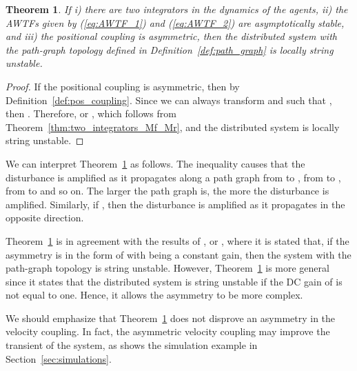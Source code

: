 \documentclass[10pt,twocolumn,twoside]{IEEEtran}
\newtheorem{theorem}{Theorem}
\theoremstyle{definition}
\newcommand{\revA}{Black}
\begin{document}
\begin{theorem}\label{thm:sym_coupl}
If i) there are two integrators in the dynamics of the agents, ii) the AWTFs given by (\ref{eq:AWTF_1}) and (\ref{eq:AWTF_2}) are asymptotically stable, and iii) the positional coupling is asymmetric, then the distributed system {\color{\revA}with the path-graph topology defined in Definition~\ref{def:path_graph}} is locally string unstable.
\end{theorem}
\begin{proof}
If the positional coupling is asymmetric, then  by Definition~\ref{def:pos_coupling}. Since we can always transform  and  such that , then . Therefore,  or , which follows from Theorem~\ref{thm:two_integrators_Mf_Mr}, and the distributed system is locally string unstable.

\end{proof}

We can interpret Theorem~\ref{thm:sym_coupl} as follows. The inequality  causes that the disturbance is amplified as it propagates {\color{\revA}along a path graph} from  to , from  to , from  to  and so on. The larger the path graph is, the more the disturbance is amplified. Similarly, if , then the disturbance is amplified as it propagates in the opposite direction.





Theorem~\ref{thm:sym_coupl} is in agreement with the results of \cite{Barooah2009}, \cite{Tangerman2012} or \cite{Herman2014c}, where it is stated that, if the asymmetry is in the form of  with  being a constant gain, then the system with the path-graph topology is string unstable. However, Theorem~\ref{thm:sym_coupl} is more general since it states that the distributed system is string unstable if the DC gain of  is not equal to one. Hence, it allows the asymmetry to be more complex.

We should emphasize that Theorem~\ref{thm:sym_coupl} does not disprove an asymmetry in the velocity coupling. In fact, the asymmetric velocity coupling may improve the transient of the system, as shows the simulation example in Section~\ref{sec:simulations}.
\end{document}
